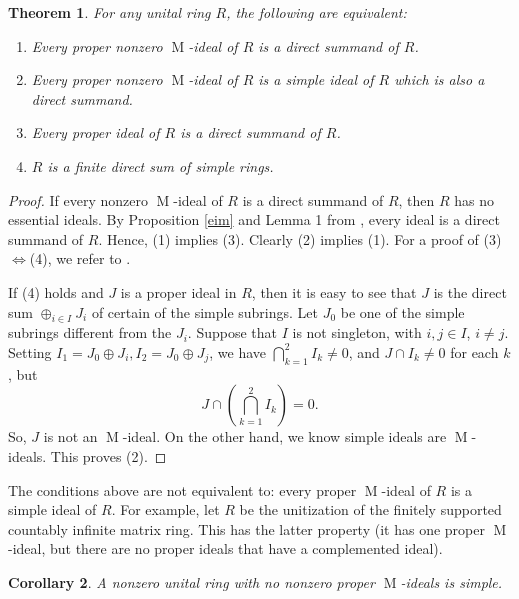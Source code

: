 \documentclass[11pt,leqno]{amsart}
\DeclareMathOperator{\m}{M}
\newtheorem{theorem}{Theorem}[section]
\newtheorem{corollary}[theorem]{Corollary}
\theoremstyle{definition}
\theoremstyle{remark}
\numberwithin{equation}{section}
\numberwithin{equation}{section}
\begin{document}
\begin{theorem}\label{dss}
For any unital ring \( R \), the following are equivalent:
\begin{enumerate}
\item Every proper nonzero  \( \m \)-ideal of \( R \) is a direct summand of \( R \).

\item Every proper nonzero  \( \m \)-ideal of \( R \) is a simple ideal of \( R \) which is also a direct summand. 

\item Every proper ideal of \( R \) is a direct summand of \( R \).

\item \( R \) is a  finite direct sum of simple rings.
\end{enumerate}
\end{theorem}

\begin{proof}
If every nonzero  \( \m \)-ideal of \( R \) is a direct summand of \( R \), then $R$ has no essential ideals.  By Proposition \ref{eim} and Lemma 1 from \cite{OJ81}, every ideal is a direct
summand of $R$.  Hence, (1) implies (3).  Clearly (2) implies (1). For a proof of (3)$\Leftrightarrow$(4), we refer to \cite{Arm68}. 

If (4) holds and $J$ is a proper ideal in $R$, then it is easy to see that $J$ is the direct sum $\oplus_{i \in I} J_i$ of certain of the simple subrings.   Let $J_0$ be one of the simple subrings different from the $J_i$. Suppose that $I$ is not singleton, with $i,j \in I$, $i \neq j$.   Setting $I_1 = J_0 \oplus  J_i, I_2 = J_0  \oplus J_j$, we have 
$\bigcap_{k=1}^2 I_k\neq 0$, and   \(J \cap I_k \neq 0\) for each \(k\), but 
\[	J \cap
 \left( \bigcap_{k=1}^2 I_k \right) =0. \]
So, $J$ is not an $\m$-ideal.   On the other hand,
we know simple ideals are $\m$-ideals.  This proves (2).
\end{proof}

The conditions above are not equivalent to: every proper \( \m \)-ideal of \( R \) is a simple ideal of \( R \).   For example, let $R$ be the unitization of  the finitely supported 
countably infinite matrix ring.
This has the latter property (it has one proper $\m$-ideal, but there are no proper ideals that have a complemented ideal).    

\begin{corollary}\label{nmi} A nonzero  unital ring with no nonzero  proper $\m$-ideals is simple. 
\end{corollary}
\end{document}
